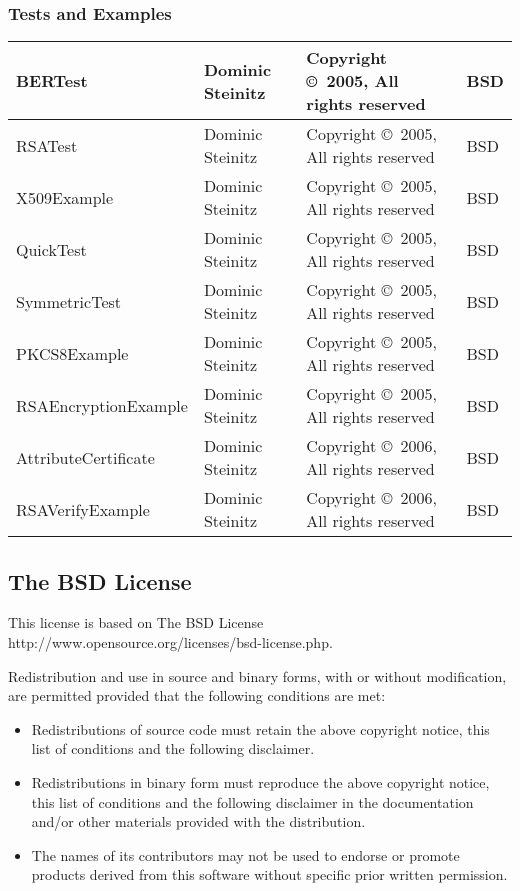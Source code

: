\documentclass{article}
\begin{document}
\subsubsection{Tests and Examples}
\begin{tabular}{|p{6cm}|p{3cm}|p{3cm}|p{1cm}|}
\hline\hline
BERTest
& Dominic Steinitz &
Copyright \copyright\ 2005, All rights reserved & BSD \\
\hline
RSATest
& Dominic Steinitz &
Copyright \copyright\ 2005, All rights reserved & BSD \\
\hline
X509Example
& Dominic Steinitz &
Copyright \copyright\ 2005, All rights reserved & BSD \\
\hline
QuickTest
& Dominic Steinitz &
Copyright \copyright\ 2005, All rights reserved & BSD \\
\hline
SymmetricTest
& Dominic Steinitz &
Copyright \copyright\ 2005, All rights reserved & BSD \\
\hline
PKCS8Example
& Dominic Steinitz &
Copyright \copyright\ 2005, All rights reserved & BSD \\
\hline
RSAEncryptionExample
& Dominic Steinitz &
Copyright \copyright\ 2005, All rights reserved & BSD \\
\hline
AttributeCertificate
& Dominic Steinitz &
Copyright \copyright\ 2006, All rights reserved & BSD \\
\hline
RSAVerifyExample
& Dominic Steinitz &
Copyright \copyright\ 2006, All rights reserved & BSD \\
\hline\hline
\end{tabular}

\subsection{The BSD License}

This license is based on
\htmladdnormallinkfoot
{The BSD License}
{http://www.opensource.org/licenses/bsd-license.php}.

Redistribution and use in source and binary forms, with or without 
modification, are permitted provided that the following conditions are met:

\begin{itemize}
\item
Redistributions of source code must retain the above copyright notice, 
this list of conditions and the following disclaimer.
\item
Redistributions in binary form must reproduce the above copyright notice, 
this list of conditions and the following disclaimer in the documentation 
and/or other materials provided with the distribution.
\item
The names of its contributors may not be used to endorse or promote 
products derived from this software without specific prior written permission.
\end{itemize}
\end{document}
